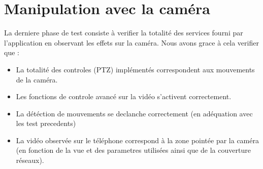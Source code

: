 \section{Manipulation avec la caméra}
La derniere phase de test consiste à verifier la totalité des services fourni
par l'application en observant les effets sur la caméra.\newline
Nous avons grace à cela verifier que :
\begin{itemize}
  \item La totalité des controles (PTZ) implémentés correspondent aux mouvements
  de la caméra.
  \item Les fonctions de controle avancé sur la vidéo s'activent correctement.
  \item La détéction de mouvements se declanche correctement (en adéquation
  avec les test precedents)
  \item La vidéo observée sur le téléphone correspond à la zone pointée par la
  caméra (en fonction de la vue et des parametres
  utilisées ainsi que de la couverture réseaux).
\end{itemize}

